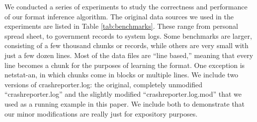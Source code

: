 We conducted a series of experiments to study the correctness
and performance of our format inference algorithm.
The original data sources we used in the experiments are listed in Table \ref{tab:benchmarks}.
These range from personal spread sheet, to government records to system logs. Some benchmarks 
are larger, consisting of a few thousand
chunks or records, while others are very small with just a few dozen lines. 
Most of the data files are ``line based,'' meaning that every line becomes a chunk
for the purposes of learning the format.  One exception is netstat-an, in which
chunks come in blocks or multiple lines.
We include two versions of crashreporter.log: the original, completely unmodified
``crashreporter.log'' and the slightly modified ``crashreporter.log.mod'' 
that we used as a running example in this paper.  We include both to 
demonstrate that our minor modifications are really just for expository purposes.



